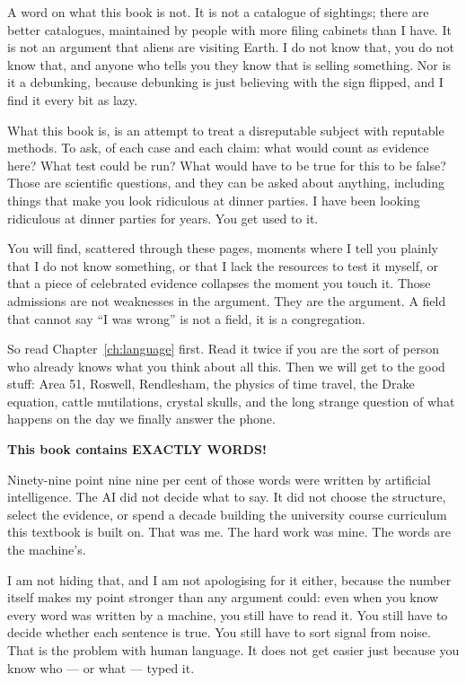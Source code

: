 A word on what this book is not. It is not a catalogue of sightings; there
are better catalogues, maintained by people with more filing cabinets than I
have. It is not an argument that aliens are visiting Earth. I do not know
that, you do not know that, and anyone who tells you they know that is
selling something. Nor is it a debunking, because debunking is just believing
with the sign flipped, and I find it every bit as lazy.

What this book is, is an attempt to treat a disreputable subject with
reputable methods. To ask, of each case and each claim: what would count as
evidence here? What test could be run? What would have to be true for this to
be false? Those are scientific questions, and they can be asked about
anything, including things that make you look ridiculous at dinner parties. I
have been looking ridiculous at dinner parties for years. You get used to it.

You will find, scattered through these pages, moments where I tell you
plainly that I do not know something, or that I lack the resources to test it
myself, or that a piece of celebrated evidence collapses the moment you touch
it. Those admissions are not weaknesses in the argument. They are the
argument. A field that cannot say ``I was wrong'' is not a field, it is a
congregation.

So read Chapter~\ref{ch:language} first. Read it twice if you are the sort of person who
already knows what you think about all this. Then we will get to the good
stuff: Area 51, Roswell, Rendlesham, the physics of time travel, the Drake
equation, cattle mutilations, crystal skulls, and the long strange question
of what happens on the day we finally answer the phone.

\bigskip
{\centering
{\small\bfseries This book contains EXACTLY \fmtwordcount{} \booklanguage{} WORDS!}\par}
\medskip
\begin{center}
\begin{minipage}{0.92\textwidth}
Ninety-nine point nine nine per cent of those words were written by artificial intelligence.
The AI did not decide what to say. It did not choose the structure, select the evidence,
or spend a decade building the university course curriculum this textbook is built on.
That was me. The hard work was mine. The words are the machine's.

I am not hiding that, and I am not apologising for it either, because the number itself
makes my point stronger than any argument could: even when you know every word was
written by a machine, you still have to read it. You still have to decide whether each
sentence is true. You still have to sort signal from noise. That is the problem with human
language. It does not get easier just because you know who --- or what --- typed it.
\end{minipage}
\end{center}


